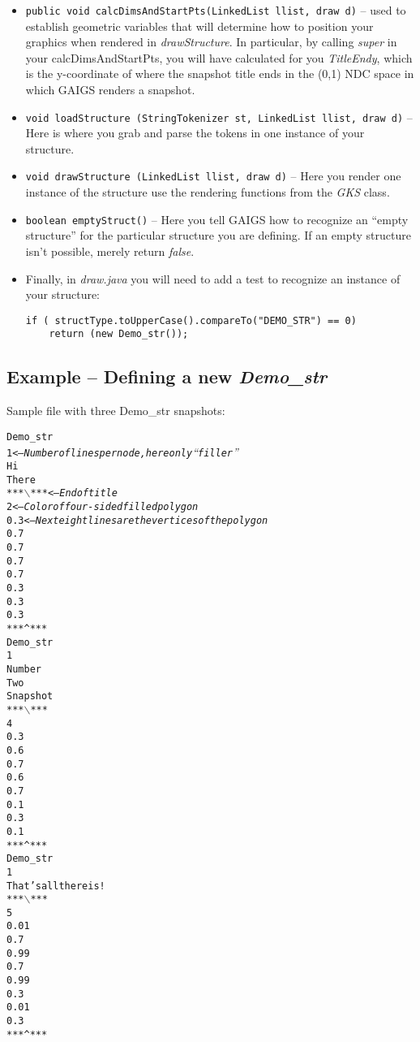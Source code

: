 \documentclass[12pt]{article}
\begin{document}
\begin{itemize}
\item \verb!public void calcDimsAndStartPts(LinkedList llist, draw d)!
  -- used to establish geometric variables that will determine how to
  position your graphics when rendered in \textit{drawStructure}.  In
  particular, by calling \textit{super} in your calcDimsAndStartPts,
  you will have calculated for you \textit{TitleEndy}, which is the
  y-coordinate of where the snapshot title ends in the (0,1) NDC space
  in which GAIGS renders a snapshot.
\item \verb!void loadStructure (StringTokenizer st, LinkedList llist, draw d)! 
-- Here is where you grab and parse the tokens in one
  instance of your structure.
\item \verb!void drawStructure (LinkedList llist, draw d)!  
-- Here  you render one instance of the structure use the rendering functions
  from the \textit{GKS} class.
\item \verb!boolean emptyStruct()!  
-- Here you tell GAIGS how to
  recognize an ``empty structure'' for the particular structure you
  are defining.  If an empty structure isn't possible, merely return
  \textit{false}.


\item Finally, in \textit{draw.java} you will need to add a test to recognize an instance of your structure:

\begin{verbatim}
if ( structType.toUpperCase().compareTo("DEMO_STR") == 0)
    return (new Demo_str());
\end{verbatim}

\end{itemize}

\subsection{Example -- Defining a new \textit{Demo\_str}}

Sample file with three Demo\_str snapshots:

\begin{alltt}
Demo_str
1              \textit{<-- Number of lines per node, here only ``filler''}
Hi
There
***\ensuremath{\backslash}***        \textit{<-- End of title}
2              \textit{<-- Color of four-sided filled polygon}
0.3            \textit{<-- Next eight lines are the vertices of the polygon}
0.7
0.7
0.7
0.7
0.3
0.3
0.3
***^***
Demo_str
1
Number
Two
Snapshot
***\ensuremath{\backslash}***
4
0.3
0.6
0.7
0.6
0.7
0.1
0.3
0.1
***^***
Demo_str
1
That's all there is!
***\ensuremath{\backslash}***
5
0.01
0.7
0.99
0.7
0.99
0.3
0.01
0.3
***^***
\end{alltt}
\end{document}
